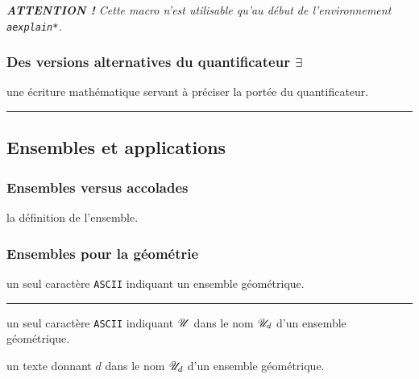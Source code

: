 \documentclass[12pt,a4paper]{article}
\newcommand\env[1]{\texttt{#1}}
\theoremstyle{definition}
\newcommand\separation{
	\medskip
	\hfill\rule{0.5\textwidth}{0.75pt}\hfill
	\medskip
}
\newcommand\ascii{\texttt{ASCII}}
\begin{document}
\emph{\textbf{ATTENTION !} Cette macro n'est utilisable qu'au début de l'environnement \env{aexplain*}.}
\subsubsection{\texorpdfstring{Des versions alternatives du quantificateur $\exists$}%
                          {Des versions alternatives du quantificateur existentiel}}



 une écriture mathématique servant à préciser la portée du quantificateur.


\separation



\subsection{Ensembles et applications}

\subsubsection{Ensembles versus accolades}



\IDarg{} la définition de l'ensemble.





\subsubsection{Ensembles pour la géométrie}


\IDarg{} un seul caractère \ascii{} indiquant un ensemble géométrique.


\separation



 un seul caractère \ascii{} indiquant $\setgeo{U}$ dans le nom $\setgeo*{U}{d}$ d'un ensemble géométrique.

 un texte donnant $d$ dans le nom $\setgeo*{U}{d}$ d'un ensemble géométrique.


\end{document}
